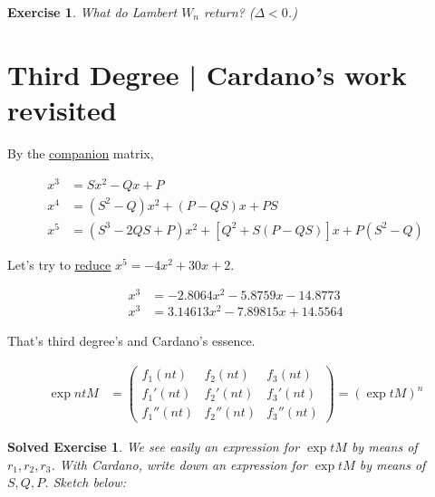 \documentclass[12pt,a4paper]{article}
\newtheorem{exercise}{Exercise}[section]
\newtheorem*{solved}{Solved Exercise}
\begin{document}
\begin{exercise}
What do Lambert $W_n$ return? ($\Delta < 0$.)
\end{exercise}

\section{Third Degree | Cardano's work revisited}

By the \href{https://www.wolframalpha.com/input/?i=\%7B\%7B0,+1,+0\%7D,+\%7B0,+0,+1\%7D,+\%7BP,+-Q,+S\%7D\%7D\%5E4}{\color{blue}\underline{companion}} matrix,

\begin{align}
x^3 &= Sx^2 - Qx + P \\
x^4 &= (S^2 - Q) x^2 + (P - QS) x + PS \\
x^5 &= (S^3 - 2 Q S + P) x^2 + [Q^2 + S(P - QS)] x + P(S^2 - Q)
\end{align}

Let's try to \href{https://www.wolframalpha.com/input/?i=-4+\%3D+S\%5E3+-+2+*Q*+S+\%2B+P+;+30+\%3D+Q\%5E2+\%2B+S*(P+-+Q*S)+;+2+\%3D+S\%5E2+-+Q}{\color{blue}\underline{reduce}} $x^5 = -4 x^2 + 30 x + 2$.

\begin{align}
x^3 &= -2.8064 x^2 - 5.8759 x - 14.8773 \\
x^3 &= 3.14613 x^2 - 7.89815 x + 14.5564
\end{align}

That's third degree's and Cardano's essence.

\begin{align}
  \exp ntM &= \left(\begin{matrix}f_1(nt) & f_2(nt) & f_3(nt) \\ f_1'(nt) & f_2'(nt) & f_3'(nt) \\ f_1''(nt) & f_2''(nt) & f_3''(nt) \end{matrix}\right) = (\exp tM)^n
\end{align}

\begin{solved}
We see easily an expression for $\exp tM$ by means of $r_1, r_2, r_3$. With Cardano, write down an expression for $\exp tM$ by means of $S, Q, P$. Sketch below:
\end{solved}
\end{document}
